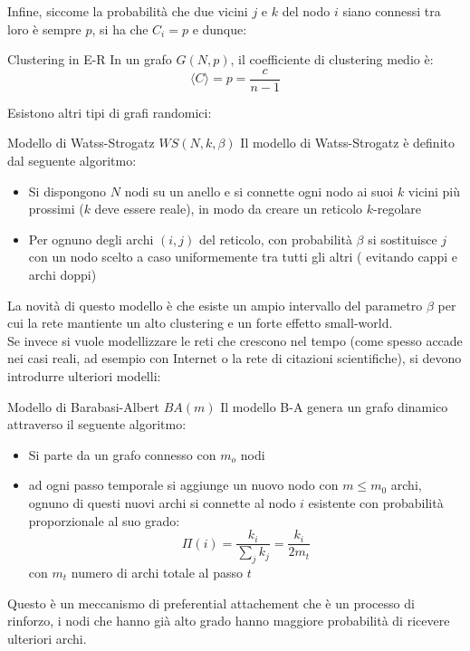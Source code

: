 Infine, siccome la probabilità che due vicini $j$ e $k$ del nodo $i$ siano connessi tra loro è sempre $p$, si ha che $C_i=p$ e dunque:
\begin{boxl}{Clustering in E-R}
In un grafo $G(N,p)$, il coefficiente di clustering medio è:
\begin{equation}
  \langle C \rangle=p=\frac{c}{n-1}
\end{equation}
\end{boxl}

Esistono altri tipi di grafi randomici:
\begin{boxb}{Modello di Watss-Strogatz $WS(N,k,\beta)$}
  Il modello di Watss-Strogatz è definito dal seguente algoritmo:
  \begin{itemize}
    \item Si dispongono $N$ nodi su un anello e si connette ogni nodo ai suoi $k$ vicini più prossimi ($k$ deve essere reale), in modo da creare un reticolo $k$-regolare
    \item Per ognuno degli archi $(i,j)$ del reticolo, con probabilità $\beta$ si sostituisce $j$ con un nodo scelto a caso uniformemente tra tutti gli altri ( evitando cappi e archi doppi)
  \end{itemize}
\end{boxb}
La novità di questo modello è che esiste un ampio intervallo del parametro $\beta$ per cui la rete mantiente un alto clustering e un forte effetto small-world.\\

Se invece si vuole modellizzare le reti che crescono nel tempo (come spesso accade nei casi reali, ad esempio con Internet o la rete di citazioni scientifiche), si devono introdurre ulteriori modelli:
\begin{boxb}{Modello di Barabasi-Albert $BA(m)$}
  Il modello B-A genera un grafo dinamico attraverso il seguente algoritmo:
  \begin{itemize}
    \item Si parte da un grafo connesso con $m_o$ nodi
    \item ad ogni passo temporale si aggiunge un nuovo nodo con $m \le m_0$ archi, ognuno di questi nuovi archi si connette al nodo $i$ esistente con probabilità proporzionale al suo grado:
    \begin{equation}
      \Pi (i)=\frac{k_i}{\sum_{j}^{}k_j}=\frac{k_i}{2m_t}
    \end{equation}
    con $m_t$ numero di archi totale al passo $t$
  \end{itemize}
\end{boxb}
Questo è un meccanismo di preferential attachement che è un processo di rinforzo, i nodi che hanno già alto grado hanno maggiore probabilità di ricevere ulteriori archi.\\

